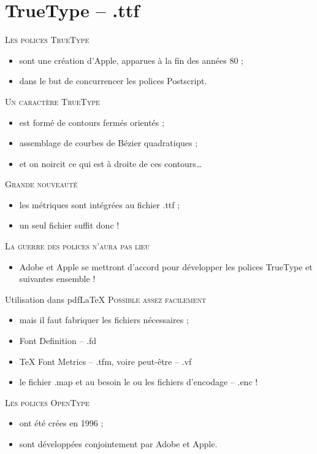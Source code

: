 \documentclass[12pt,a4paper,twocolumn]{book} %
\begin{document}
{\section{TrueType -- .ttf}		
	{\textsc{Les polices TrueType}}
		\begin{itemize}
			\item<+-> sont une création d'Apple, apparues à la fin des années 80 ;
			\item<+-> dans le but de concurrencer les polices Postscript.
		\end{itemize}	
	{\textsc{Un caractère TrueType}}
		\begin{itemize}
			\item<+-> est formé de contours fermés orientés ;
			\item<+-> assemblage de courbes de Bézier quadratiques ;
			\item<+-> et on noircit ce qui est à droite de ces contours\dots
		\end{itemize}	
{\textsc{Grande nouveauté}}
		\begin{itemize}
			\item<+-> les métriques sont intégrées au fichier .ttf ;
			\item<+-> un seul fichier suffit donc !
		\end{itemize}	
{\textsc{La guerre des polices n'aura pas lieu}}
		\begin{itemize}
			\item<+-> Adobe et Apple se mettront d'accord pour développer les polices TrueType et suivantes ensemble !
		\end{itemize}		


Utilisation dans pdf\LaTeX		
{\textsc{Possible assez facilement}}
		\begin{itemize}
			\item<+-> mais il faut fabriquer les fichiers nécessaires ;
			\item<+-> Font Definition -- .fd
			\item<+-> TeX Font Metrics -- .tfm, voire peut-être -- .vf
			\item<+-> le fichier .map et au besoin le ou les fichiers d'encodage -- .enc !
		\end{itemize}
{\textsc{Les polices OpenType}}
		\begin{itemize}
			\item<+-> ont été crées en 1996 ;
			\item<+-> sont développées conjointement par Adobe et Apple.
		\end{itemize}
		
}
\end{document}
